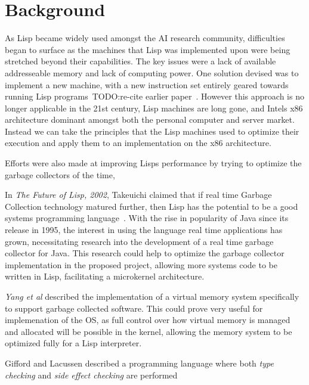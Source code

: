 \documentclass{article}
\begin{document}
  \section{Background}
  \iffalse
  show old lisp problems with gc and perf (p558-bobrow, )
  
  show relevant GC research (p103-yang, )
  
  show lisp/functional distributed research
  \fi

  As Lisp became widely used amongst the AI research community, difficulties began to surface as the machines that Lisp was implemented upon were being stretched beyond their capabilities. The key issues were a lack of available addresseable memory and lack of computing power. One solution devised was to implement a new machine, with a new instruction set entirely geared towards running Lisp programs~TODO:re-cite earlier paper~\cite{knight-lisp}. However this approach is no longer applicable in the 21st century, Lisp machines are long gone, and Intels x86 architecture dominant amongst both the personal computer and server market. Instead we can take the principles that the Lisp machines used to optimize their execution and apply them to an implementation on the x86 architecture.
  
  Efforts were also made at improving Lisps performance by trying to optimize the garbage collectors of the time\cite{WhiteJon1987Amfa}, 
  \par
  In \textit{The Future of Lisp, 2002}, Takeuichi claimed that if real time Garbage Collection technology matured further, then Lisp has the potential to be a good systems programming language~\cite{TakeuchiIkuo2002TfoL}. With the rise in popularity of Java since its release in 1995, the interest in using the language real time applications has grown, necessitating research into the development of a real time garbage collector for Java\cite{SiebertF.2010Cprg}\cite{SchoeberlMartin2010Nrgc}\cite{KaliberaTomas2011Srgc}. This research could help to optimize the garbage collector implementation in the proposed project, allowing more systems code to be written in Lisp, facilitating a microkernel architecture.
  \par
  \textit{Yang et al} described the implementation of a virtual memory system specifically to support garbage collected software\cite{Yang:2006:CVM:1298455.1298466}. This could prove very useful for implemenation of the OS, as full control over how virtual memory is managed and allocated will be possible in the kernel, allowing the memory system to be optimized fully for a Lisp interpreter.
  \par
  Gifford and Lacussen described a programming language where both \textit{type checking} and \textit{side effect checking} are performed~\cite{Gifford:1986:IFI:319838.319848}
\end{document}
